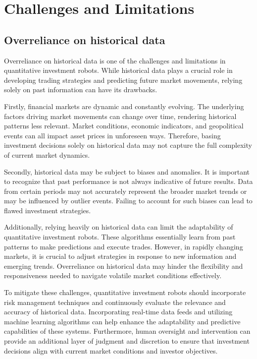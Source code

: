 \documentclass[UTF8]{ctexart}
\begin{document}
\section{Challenges and Limitations}
\subsection{Overreliance on historical data}
Overreliance on historical data is one of the challenges and limitations in quantitative investment robots. While historical data plays a crucial role in developing trading strategies and predicting future market movements, relying solely on past information can have its drawbacks.

Firstly, financial markets are dynamic and constantly evolving. The underlying factors driving market movements can change over time, rendering historical patterns less relevant. Market conditions, economic indicators, and geopolitical events can all impact asset prices in unforeseen ways. Therefore, basing investment decisions solely on historical data may not capture the full complexity of current market dynamics.

Secondly, historical data may be subject to biases and anomalies. It is important to recognize that past performance is not always indicative of future results. Data from certain periods may not accurately represent the broader market trends or may be influenced by outlier events. Failing to account for such biases can lead to flawed investment strategies.

Additionally, relying heavily on historical data can limit the adaptability of quantitative investment robots. These algorithms essentially learn from past patterns to make predictions and execute trades. However, in rapidly changing markets, it is crucial to adjust strategies in response to new information and emerging trends. Overreliance on historical data may hinder the flexibility and responsiveness needed to navigate volatile market conditions effectively.

To mitigate these challenges, quantitative investment robots should incorporate risk management techniques and continuously evaluate the relevance and accuracy of historical data. Incorporating real-time data feeds and utilizing machine learning algorithms can help enhance the adaptability and predictive capabilities of these systems. Furthermore, human oversight and intervention can provide an additional layer of judgment and discretion to ensure that investment decisions align with current market conditions and investor objectives.
\end{document}

